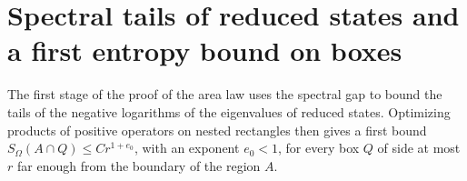 \chapter{Spectral tails of reduced states and a first entropy bound on boxes}
\label{ch:area_law_initial_bound}

The first stage of the proof of the area law \cite[Section~3]{OpenAI2026AreaLaw}
uses the spectral gap to bound the tails of the negative logarithms of the
eigenvalues of reduced states. Optimizing products of positive operators on
nested rectangles then gives a first bound $S_\Omega(A\cap Q)\le Cr^{1+e_0}$,
with an exponent $e_0<1$, for every box $Q$ of side at most $r$ far enough
from the boundary of the region $A$.






